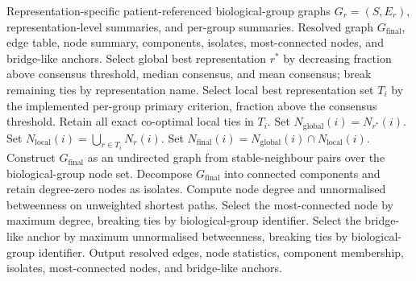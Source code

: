 \begin{algorithm}[H]
\caption{Detailed graph-based consensus resolution}
\label{alg:supp_graph_based_consensus_resolution}
\small
\begin{algorithmic}[1]
\Require Representation-specific patient-referenced biological-group graphs \(G_r=(S,E_r)\), representation-level summaries, and per-group summaries.
\Ensure Resolved graph \(G_{\mathrm{final}}\), edge table, node summary, components, isolates, most-connected nodes, and bridge-like anchors.
\State Select global best representation \(r^\ast\) by decreasing fraction above consensus threshold, median consensus, and mean consensus; break remaining ties by representation name.
  \State Select local best representation set \(T_i\) by the implemented per-group primary criterion, fraction above the consensus threshold.
  \State Retain all exact co-optimal local ties in \(T_i\).
  \State Set \(N_{\mathrm{global}}(i)=N_{r^\ast}(i)\).
  \State Set \(N_{\mathrm{local}}(i)=\bigcup_{r\in T_i}N_r(i)\).
  \State Set \(N_{\mathrm{final}}(i)=N_{\mathrm{global}}(i)\cap N_{\mathrm{local}}(i)\).
\EndFor
\State Construct \(G_{\mathrm{final}}\) as an undirected graph from stable-neighbour pairs over the biological-group node set.
\State Decompose \(G_{\mathrm{final}}\) into connected components and retain degree-zero nodes as isolates.
  \State Compute node degree and unnormalised betweenness on unweighted shortest paths.
  \State Select the most-connected node by maximum degree, breaking ties by biological-group identifier.
  \State Select the bridge-like anchor by maximum unnormalised betweenness, breaking ties by biological-group identifier.
\EndFor
\State Output resolved edges, node statistics, component membership, isolates, most-connected nodes, and bridge-like anchors.
\end{algorithmic}
\end{algorithm}

